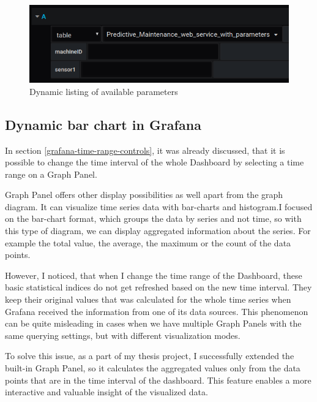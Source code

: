 \begin{figure}[h]
	\centering
	\includegraphics[width=130mm, keepaspectratio]{figures/dynamic-parameters.png}
	\caption{Dynamic listing of available parameters}
	\label{fig:dynamic-parameters}
\end{figure}

\subsection{Dynamic bar chart in Grafana} \label{dynamic-barchart}

In section \ref{grafana-time-range-controls}, it was already discussed, that it is possible to change the time interval of the whole Dashboard by selecting a time range on a Graph Panel.

Graph Panel offers other display possibilities as well apart from the graph diagram. It can visualize time series data with bar-charts and histogram.I focused on the bar-chart format, which groups the data by series and not time, so with this type of diagram, we can display aggregated information about the series. For example the total value, the average, the maximum or the count of the data points.

However, I noticed, that when I change the time range of the Dashboard, these basic statistical indices do not get refreshed based on the new time interval. They keep their original values that was calculated for the whole time series when Grafana received the information from one of its data sources. This phenomenon can be quite misleading in cases when we have multiple Graph Panels with the same querying settings, but with different visualization modes.

To solve this issue, as a part of my thesis project, I successfully extended the built-in Graph Panel, so it calculates the aggregated values only from the data points that are in the time interval of the dashboard. This feature enables a more interactive and valuable insight of the visualized data.

